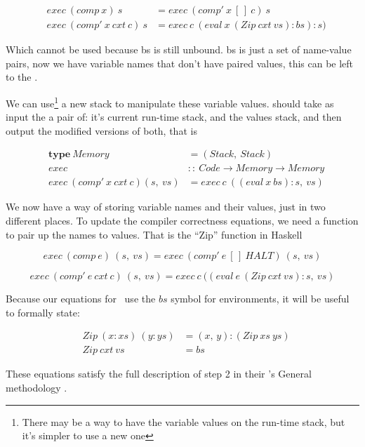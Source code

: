 \documentclass {article}
\begin{document}
\begin{eqnarray*}
	&exec\ (comp\ x)\ s  
		&= exec\ (comp'\ x\ [\,]\ c)\ s  \\
	&exec\ (comp'\ x\ cxt\ c)\ s  
		&= exec\ c\ (eval\ x\ (Zip\ cxt\ vs):bs):s)
\end{eqnarray*}

Which cannot be used
because bs is still unbound.
bs is just a set of name-value pairs,
now we have variable names
that don't have paired values,
this can be left to the \vm.

We can use\footnote{
There may be a way to have the variable values
on the run-time stack, but it's
simpler to use a new one}
a new stack to
manipulate these variable values.
\exec should take as input
the a pair of:
it's current run-time stack,
and the values stack,
and then output the modified versions of both,
that is

\begin{eqnarray*}
	&\textbf{type}\ Memory\ &= (Stack,\ Stack) \\
	&exec &::\ Code \rightarrow Memory \rightarrow Memory \\
	&exec\ (comp'\ x\ cxt\ c) (s,\ vs) &= exec\ c\ ((eval\ x\ bs):s,\ vs)
\end{eqnarray*}

We now have a way of storing variable names
and their values, 
just in two different places.
To update the compiler correctness equations,
we need a function to pair up the names
to values.
That is the ``Zip'' function in Haskell

\begin{spec}
	\[ exec\ (comp\ e)\ (s,\ vs) 
		= exec\ (comp'\ e\ [\,]\ HALT)\ (s,\ vs) \]
\end{spec}
\begin{spec}
	\[ exec\ (comp'\ e\ cxt\ c)\ (s,\ vs) 
		= exec\ c\ ((eval\ e\ (Zip\ cxt\ vs):s,\ vs) \]
\end{spec}

Because our equations for \eval\
use the $bs$ symbol for environments,
it will be useful to formally state:

\begin{eqnarray}
&Zip\ (x:xs)\ (y:ys) &= (x,\, y):(Zip\ xs\ ys)  \\ \label{ziden}
&Zip\ cxt\ vs &= bs \label{zcxtvs}
\end{eqnarray}
	
These equations satisfy the full description
of step 2 in their \BH's General methodology
\cite[page 42]{bandh}.
\end{document}
